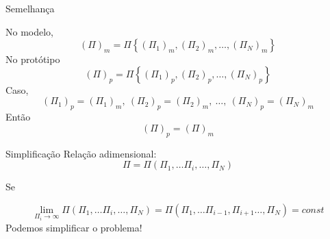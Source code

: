 \documentclass{beamer}
\begin{document}
\begin{frame}{Semelhança}

  No modelo,
\[
\left(\Pi\right)_m = \Pi\left\{\left(\Pi_1\right)_m, \left(\Pi_2\right)_m, \ldots, \left(\Pi_N\right)_m \right\}
\]
No protótipo
\[
\left(\Pi\right)_p = \Pi\left\{\left(\Pi_1\right)_p, \left(\Pi_2\right)_p, \ldots, \left(\Pi_N\right)_p \right\}
\]
Caso,
\[
\left(\Pi_1\right)_p = \left(\Pi_1\right)_m, \: \left(\Pi_2\right)_p = \left(\Pi_2\right)_m, \: \ldots, \: \left(\Pi_N\right)_p = \left(\Pi_N\right)_m
\]
Então
\[
\left(\Pi\right)_p = \left(\Pi\right)_m
\]

\end{frame}

\begin{frame}{Simplificação}
  Relação adimensional:
  \[
\Pi = \Pi\left(\Pi_1, \ldots \Pi_i, \ldots, \Pi_N \right)
\]

Se 

\[
\lim_{\Pi_i\to\infty} \Pi\left(\Pi_1, \ldots \Pi_i, \ldots, \Pi_N \right) = \Pi\left(\Pi_1, \ldots \Pi_{i-1},\Pi_{i+1} \ldots, \Pi_N \right) = const
\]
Podemos simplificar o problema!

\end{frame}
\end{document}
